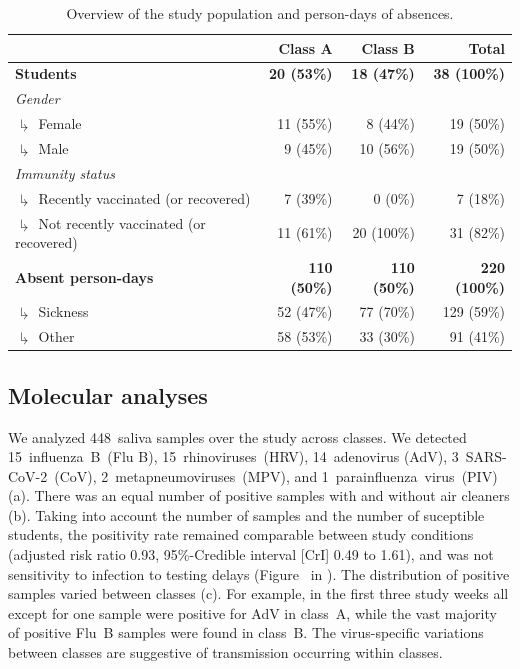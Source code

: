 \documentclass[fleqn,11pt]{wlscirep}
\begin{document}
\begin{table}[!htpb]
    \centering
    \caption{Overview of the study population and person-days of absences.}
    \label{tab:cases-overview-school}
    \footnotesize
    \begin{tabular}{l r r r}
    \toprule
         &  Class A & Class B & Total \\ \midrule 
        \textbf{Students} & \textbf{20 (53\%)} & \textbf{18 (47\%)} & \textbf{38 (100\%)} \\
        \emph{Gender} \\
        $\drsh$ Female & 11 (55\%) & 8 (44\%) & 19 (\hphantom{0}50\%) \\
        $\drsh$ Male & 9 (45\%) & 10 (56\%) & 19 (\hphantom{0}50\%) \\
        \emph{Immunity status} \\
        $\drsh$ Recently vaccinated (or recovered) & 7 (39\%) & 0 (0\%) & 7 (\hphantom{0}18\%) \\
        $\drsh$ Not recently vaccinated (or recovered) & 11 (61\%) & 20 (100\%) & 31 (\hphantom{0}82\%) \\
        \textbf{Absent person-days} & \textbf{110 (50\%)} & \textbf{110 (50\%)} & \textbf{220 (100\%)} \\
        $\drsh$ Sickness & 52 (47\%) & 77 (70\%) & 129 (\hphantom{0}59\%) \\
        $\drsh$ Other & 58 (53\%) & 33 (30\%) & 91 (\hphantom{0}41\%) \\
        \bottomrule
    \end{tabular} 
\end{table}

\subsection{Molecular analyses}

We analyzed 448~saliva samples over the study across classes. We detected 15~influenza~B~(Flu B), 15~rhinoviruses~(HRV), 14~adenovirus (AdV), 3~SARS-CoV-2~(CoV), 2~metapneumoviruses~(MPV), and 1~parainfluenza~virus~(PIV) (a). There was an equal number of positive samples with and without air cleaners (b). Taking into account the number of samples and the number of suceptible students, the positivity rate remained comparable between study conditions (adjusted risk ratio 0.93, 95\%-Credible interval [CrI] 0.49 to 1.61), and was not sensitivity to infection to testing delays (Figure~ in \supp). The distribution of positive samples varied between classes (c). For example, in the first three study weeks all except for one sample were positive for AdV in class~A, while the vast majority of positive Flu~B samples were found in class~B. The virus-specific variations between classes are suggestive of transmission occurring within classes.
\end{document}
